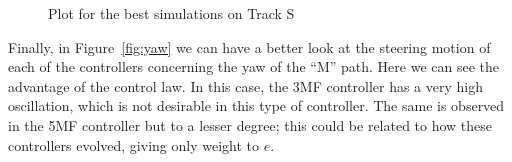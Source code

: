 \documentclass[symmetry,article,submit,moreauthors,pdftex]{Definitions/mdpi}
\begin{document}
\begin{figure}[H]
    \widefigure
     \centering
     \caption{Plot for the best simulations on Track S}
        \label{fig:3RutasS}
\end{figure}
\begin{paracol}{2}
\linenumbers
\switchcolumn


Finally, in Figure~\ref{fig:yaw} we can have a better look at the steering
motion of each of the controllers concerning the yaw of the ``M'' path. Here we
can see the advantage of the control law. In this case, the 3MF controller has
a very high oscillation, which is not desirable in this type of controller. The
same is observed in the 5MF controller but to a lesser degree; this could be related to how
these controllers evolved, giving only weight to $e$. 

\end{paracol}
\end{document}
